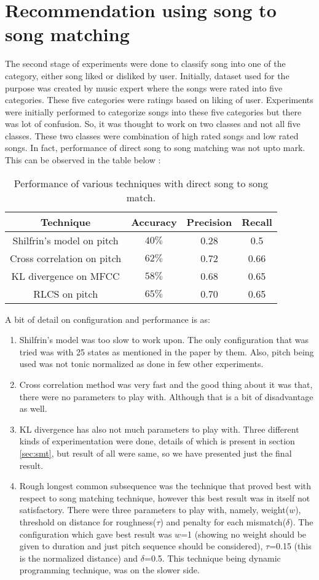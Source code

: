  
\section{Recommendation using song to song matching}
\label{sec:ssm}
The second stage of experiments were done to classify song into one of the category, either song liked or disliked by user. Initially, dataset used for the purpose was created by music expert where the songs were rated into five categories. These five categories were ratings based on liking of user. Experiments were initially performed to categorize songs into these five categories but there was lot of confusion. So, it was thought to work on two classes and not all five classes. These two classes were combination of high rated songs and low rated songs. In fact, performance of direct song to song matching was not upto mark. This can be observed in the table below :
\begin{table}[!htbp]
\centering
\label{table:perf}

\begin{tabular}{|c|c|c|c|} 
\hline
 Technique & Accuracy & Precision & Recall  \\ \hline
 Shilfrin's model on pitch& $40\%$ & 0.28  & 0.5  \\ \hline
 Cross correlation on pitch& $62\%$ & 0.72  & 0.66 \\ \hline
 KL divergence on MFCC& $58\%$ & 0.68  & 0.65 \\ \hline
 RLCS on pitch & $65\%$ &  0.70 & 0.65 \\ \hline
\end{tabular}
\caption{Performance of various techniques with direct song to song match.}
\end{table}
\par A bit of detail on configuration and performance is as:
\begin{enumerate}
\item Shilfrin's model was too slow to work upon. The only configuration that was tried was with 25 states as mentioned in the paper by them. Also, pitch being used was not tonic normalized as done in few other experiments.
\item Cross correlation method was very fast and the good thing about it was that, there were no parameters to play with. Although that is a bit of disadvantage as well.
\item KL divergence has also not much parameters to play with. Three different kinds of experimentation were done, details of which is present in section \ref{sec:smt}, but result of all were same, so we have presented just the final result.
\item Rough longest common subsequence was the technique that proved best with respect to song matching technique, however this best result was in itself not satisfactory. There were three parameters to play with, namely, weight($w$), threshold on distance for roughness($\tau$) and penalty for each mismatch($\delta$). The configuration which gave best result was $w$=1 (showing no weight should be given to duration and just pitch sequence should be considered), $\tau$=0.15 (this is the normalized distance) and $\delta$=0.5. This technique being dynamic programming technique, was on the slower side.
\end{enumerate}
